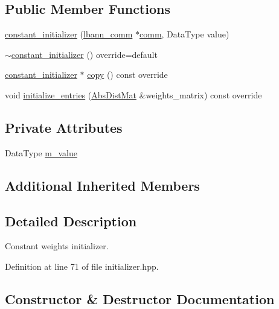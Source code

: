 \subsection*{Public Member Functions}
\begin{DoxyCompactItemize}
\item 
\hyperlink{classlbann_1_1constant__initializer_a2b8096bcc8c5a8c780926594d1b8441d}{constant\+\_\+initializer} (\hyperlink{classlbann_1_1lbann__comm}{lbann\+\_\+comm} $\ast$\hyperlink{file__io_8cpp_ab048c6f9fcbcfaa57ce68b00263dbebe}{comm}, Data\+Type value)
\item 
\hyperlink{classlbann_1_1constant__initializer_af134f1b82a60829d9fdf2eabc32356ed}{$\sim$constant\+\_\+initializer} () override=default
\item 
\hyperlink{classlbann_1_1constant__initializer}{constant\+\_\+initializer} $\ast$ \hyperlink{classlbann_1_1constant__initializer_a1af9be89f528045f47abf13818d814ce}{copy} () const override
\item 
void \hyperlink{classlbann_1_1constant__initializer_ae3fb3bba90bd6a7e393ecc223aa5d62c}{initialize\+\_\+entries} (\hyperlink{base_8hpp_a9a697a504ae84010e7439ffec862b470}{Abs\+Dist\+Mat} \&weights\+\_\+matrix) const override
\end{DoxyCompactItemize}
\subsection*{Private Attributes}
\begin{DoxyCompactItemize}
\item 
Data\+Type \hyperlink{classlbann_1_1constant__initializer_ac0f04ad951799fa970f3dea78988cdb5}{m\+\_\+value}
\end{DoxyCompactItemize}
\subsection*{Additional Inherited Members}


\subsection{Detailed Description}
Constant weights initializer. 

Definition at line 71 of file initializer.\+hpp.



\subsection{Constructor \& Destructor Documentation}
\mbox{\label{classlbann_1_1constant__initializer_a2b8096bcc8c5a8c780926594d1b8441d}} 
